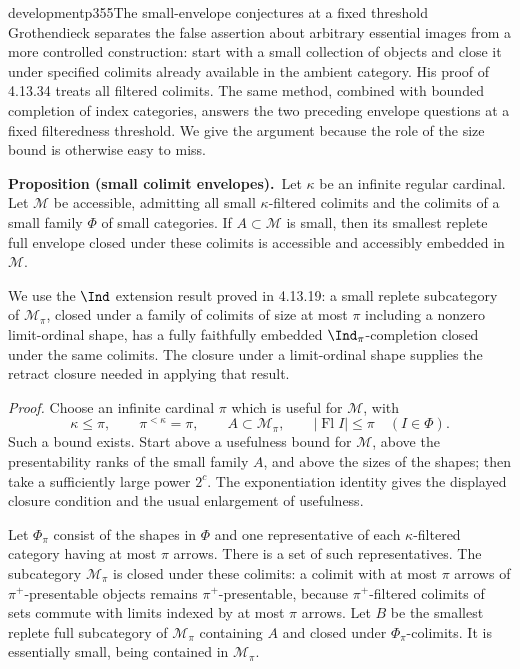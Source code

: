 \begin{dcomment}{development}{p355}{The small-envelope conjectures at a fixed threshold}
Grothendieck separates the false assertion about arbitrary essential images from a more controlled construction: start with a small collection of objects and close it under specified colimits already available in the ambient category. His proof of 4.13.34 treats all filtered colimits. The same method, combined with bounded completion of index categories, answers the two preceding envelope questions at a fixed filteredness threshold. We give the argument because the role of the size bound is otherwise easy to miss.

\textbf{Proposition (small colimit envelopes).}\ours\
Let $\kappa$ be an infinite regular cardinal. Let $\mathcal M$ be accessible, admitting all small $\kappa$-filtered colimits and the colimits of a small family $\Phi$ of small categories. If $A\subset\mathcal M$ is small, then its smallest replete full envelope closed under these colimits is accessible and accessibly embedded in $\mathcal M$.

We use the $\Ind$ extension result proved in 4.13.19: a small replete subcategory of $\mathcal M_\pi$, closed under a family of colimits of size at most $\pi$ including a nonzero limit-ordinal shape, has a fully faithfully embedded $\Ind_\pi$-completion closed under the same colimits. The closure under a limit-ordinal shape supplies the retract closure needed in applying that result.

\textit{Proof.} Choose an infinite cardinal $\pi$ which is useful for $\mathcal M$, with
\[
 \kappa\leq\pi,\qquad \pi^{<\kappa}=\pi,
 \qquad A\subset\mathcal M_\pi,
 \qquad |\operatorname{Fl}I|\leq\pi\quad(I\in\Phi).
\]
Such a bound exists. Start above a usefulness bound for $\mathcal M$, above the presentability ranks of the small family $A$, and above the sizes of the shapes; then take a sufficiently large power $2^c$. The exponentiation identity gives the displayed closure condition and the usual enlargement of usefulness.

Let $\Phi_\pi$ consist of the shapes in $\Phi$ and one representative of each $\kappa$-filtered category having at most $\pi$ arrows. There is a set of such representatives. The subcategory $\mathcal M_\pi$ is closed under these colimits: a colimit with at most $\pi$ arrows of $\pi^+$-presentable objects remains $\pi^+$-presentable, because $\pi^+$-filtered colimits of sets commute with limits indexed by at most $\pi$ arrows. Let $B$ be the smallest replete full subcategory of $\mathcal M_\pi$ containing $A$ and closed under $\Phi_\pi$-colimits. It is essentially small, being contained in $\mathcal M_\pi$.


\end{dcomment}
